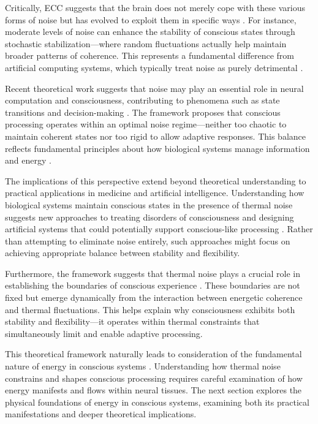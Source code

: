 \begin{refsection}
Critically, ECC suggests that the brain does not merely cope with these various forms of noise but has evolved to exploit them in specific ways \cite{mcdonnell2011}. For instance, moderate levels of noise can enhance the stability of conscious states through stochastic stabilization—where random fluctuations actually help maintain broader patterns of coherence. This represents a fundamental difference from artificial computing systems, which typically treat noise as purely detrimental \cite{keizer1987}.

Recent theoretical work suggests that noise may play an essential role in neural computation and consciousness, contributing to phenomena such as state transitions and decision-making \cite{rolls2010}. The framework proposes that conscious processing operates within an optimal noise regime—neither too chaotic to maintain coherent states nor too rigid to allow adaptive responses. This balance reflects fundamental principles about how biological systems manage information and energy \cite{sejnowski2014}.

The implications of this perspective extend beyond theoretical understanding to practical applications in medicine and artificial intelligence. Understanding how biological systems maintain conscious states in the presence of thermal noise suggests new approaches to treating disorders of consciousness and designing artificial systems that could potentially support conscious-like processing \cite{parrondo2015}. Rather than attempting to eliminate noise entirely, such approaches might focus on achieving appropriate balance between stability and flexibility.

Furthermore, the framework suggests that thermal noise plays a crucial role in establishing the boundaries of conscious experience \cite{fox2007}. These boundaries are not fixed but emerge dynamically from the interaction between energetic coherence and thermal fluctuations. This helps explain why consciousness exhibits both stability and flexibility—it operates within thermal constraints that simultaneously limit and enable adaptive processing.

This theoretical framework naturally leads to consideration of the fundamental nature of energy in conscious systems \cite{attwell2001}. Understanding how thermal noise constrains and shapes conscious processing requires careful examination of how energy manifests and flows within neural tissues. The next section explores the physical foundations of energy in conscious systems, examining both its practical manifestations and deeper theoretical implications.


\end{refsection}
